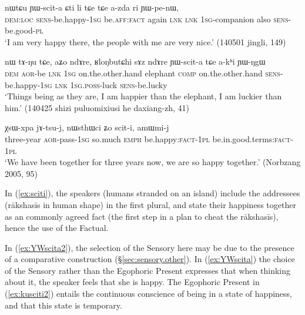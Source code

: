 \begin{exe}
\ex \label{ex:YWscita}
\gll nɯtɕu ɲɯ-scit-a ɕti li tɕe tɕe a-zda ri ɲɯ-pe-nɯ, \\
\textsc{dem}:\textsc{loc} \textsc{sens}-be.happy-\textsc{1sg} be.\textsc{aff}:\textsc{fact} again \textsc{lnk} \textsc{lnk} \textsc{1sg}-companion also \textsc{sens}-be.good-\textsc{pl} \\
\glt `I am very happy there, the people with me are very nice.' (140501 jingli, 149)
\end{exe}

\begin{exe}
\ex \label{ex:YWscita2}
\gll nɯ tɤ-ŋu tɕe, aʑo ndɤre, ʁloŋbutɕhi sɤz ndɤre ɲɯ-scit-a tɕe a-kʰi ɲɯ-ŋgɯ \\
\textsc{dem} \textsc{aor}-be \textsc{lnk} \textsc{1sg} on.the.other.hand elephant \textsc{comp} on.the.other.hand \textsc{sens}-be.happy-\textsc{1sg} \textsc{lnk} \textsc{1sg}.\textsc{poss}-luck \textsc{sens}-be.lucky \\
\glt `Things being as they are, I am happier than the elephant, I am luckier than him.' (140425 shizi puluomixiusi he daxiang-zh, 41)
\end{exe}


\begin{exe}
\ex \label{ex:sciti}
\gll χsɯ-xpa jɤ-tsu-j, nɯsthɯci ʑo scit-i, amɯmi-j  \\
three-year \textsc{aor}-pass-\textsc{1sg} so.much \textsc{emph} be.happy:\textsc{fact}-\textsc{1pl} be.in.good.terms:\textsc{fact}-\textsc{1pl} \\
\glt `We have been together for three years now, we are so happy together.' (Norbzang 2005, 95)
\end{exe}

In (\ref{ex:sciti}), the speakers (humans stranded on an island) include the addressees (rākshasīs in human shape) in the first plural, and state their happiness together as an commonly agreed fact (the first step in a plan to cheat the rākshasīs), hence the use of the Factual. 

In (\ref{ex:YWscita2}), the selection of the Sensory here may be due to the presence of a comparative construction (§\ref{sec:sensory.other}). In (\ref{ex:YWscita}) the choice of the Sensory rather than the Egophoric Present expresses that when thinking about it, the speaker feels that she is happy. The Egophoric Present in (\ref{ex:kusciti2}) entails the continuous conscience of being in a state of happiness, and that this state is temporary.

